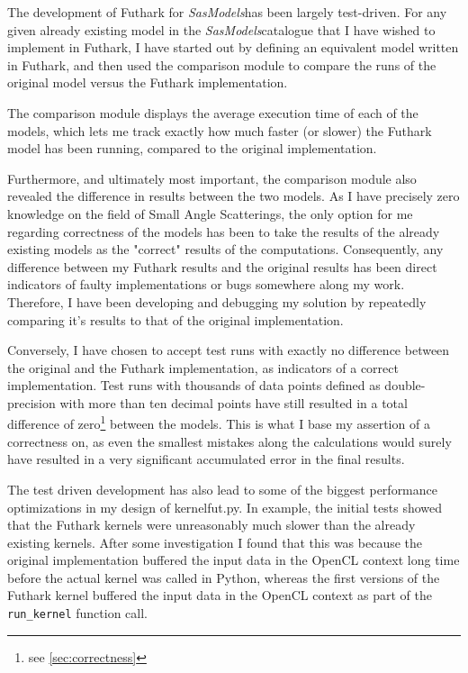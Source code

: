 \documentclass[11pt]{article}
\newcommand{\sasmodels}{\textit{SasModels}}
\begin{document}
The development of Futhark for \sasmodels has been largely test-driven.
For any given already existing model in the \sasmodels catalogue that I have
wished to implement in Futhark, I have started out by defining an equivalent
model written in Futhark, and then used the comparison module to compare the
 runs of the original model versus the Futhark implementation.

The comparison module displays the average execution time of each of the models,
which lets me track exactly how much faster (or slower) the Futhark model has
been running, compared to the original implementation.

Furthermore, and ultimately most important, the comparison module also
revealed the difference in results between the two models. 
As I have precisely zero knowledge on the field of Small Angle Scatterings, 
the only option for me regarding correctness of the models has been to take
the results of the already existing models as the "correct" results of the
computations. Consequently, any difference between my Futhark results and the
original results has been direct indicators of faulty implementations or bugs
somewhere along my work.
Therefore, I have been developing and debugging my solution by repeatedly
comparing it's results to that of the original implementation.

Conversely, I have chosen to accept test runs with exactly no difference
between the original and the Futhark implementation, as indicators of a
correct implementation. 
Test runs with thousands of data points defined as double-precision
with more than ten decimal points have still resulted in a total difference of
zero\footnote{see \ref{sec:correctness}} between the models.
This is what I base my assertion of a correctness on, as even the smallest 
mistakes along the calculations would surely have resulted in a very significant
accumulated error in the final results.

The test driven development has also lead to some of the biggest performance
optimizations in my design of kernelfut.py.
In example, the initial tests showed that the Futhark kernels were unreasonably
much slower than the already existing kernels. After some investigation I found
that this was because the original implementation buffered the input data in the
OpenCL context long time before the actual kernel was called in Python, whereas
the first versions of the Futhark kernel buffered the input data in the OpenCL
context as part of the \texttt{run\_kernel} function call.
\end{document}

